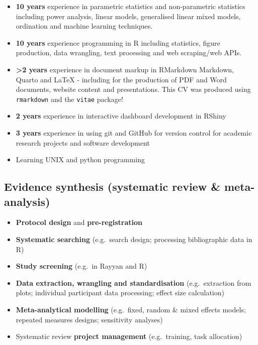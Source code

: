 \documentclass[11pt,a4paper,]{awesome-cv}
\begin{document}
\begin{itemize}
\item
  \textbf{10 years} experience in parametric statistics and
  non-parametric statistics including power analysis, linear models,
  generalised linear mixed models, ordination and machine learning
  techniques.
\item
  \textbf{10 years} experience programming in R including statistics,
  figure production, data wrangling, text processing and web
  scraping/web APIs.
\item
  \textbf{\textgreater2 years} experience in document markup in
  RMarkdown Markdown, Quarto and LaTeX - including for the production of
  PDF and Word documents, website content and presentations. This CV was
  produced using \texttt{rmarkdown} and the \texttt{vitae} package!
\item
  \textbf{2 years} experience in interactive dashboard development in
  RShiny
\item
  \textbf{3 years} experience in using git and GitHub for version
  control for academic research projects and software development
\item
  Learning UNIX and python programming
\end{itemize}

\hypertarget{evidence-synthesis-systematic-review-meta-analysis}{%
\subsection{Evidence synthesis (systematic review \&
meta-analysis)}\label{evidence-synthesis-systematic-review-meta-analysis}}

\begin{itemize}
\item
  \textbf{Protocol design} and \textbf{pre-registration}
\item
  \textbf{Systematic searching} (e.g.~search design; processing
  bibliographic data in R)
\item
  \textbf{Study screening} (e.g.~in Rayyan and R)
\item
  \textbf{Data extraction, wrangling and standardisation}
  (e.g.~extraction from plots; individual participant data processing;
  effect size calculation)
\item
  \textbf{Meta-analytical modelling} (e.g.~fixed, random \& mixed
  effects models; repeated measures designs; sensitivity analyses)
\item
  Systematic review \textbf{project management} (e.g.~training, task
  allocation)
\end{itemize}
\end{document}
